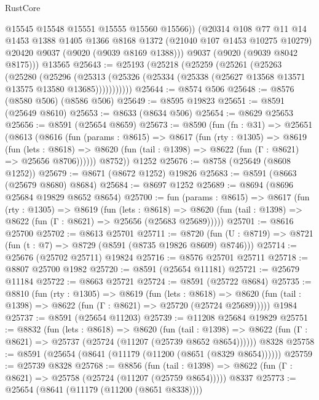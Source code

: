 \begin{lexlean}{RustCore}
\begin{coremodule}
          @15545
          @15548
          @15551
          @15555
          @15560
          @15566))
      (@20314
        @108
        @77
        @11
        @14
        @1453
        @1388
        @1405
        @1366
        @8168
        @1372
        (@21040 @107 @1453 @10275 @10279)
        @20420
        @9037
        (@9020 (@9039 @8169 @1388)))
      @9037
      (@9020 (@9039 @8042 @8175)))
    @13565
@25643 := @25193
    (@25218
      (@25259
        (@25261
          (@25263
            (@25280
              (@25296
                (@25313
                  (@25326 (@25334 (@25338 (@25627 @13568 @13571 @13575 @13580 @13685)))))))))))
@25644 := @8574 @506
@25648 := @8576 (@8580 @506) (@8586 @506)
@25649 := @8595 @19823
@25651 := @8591 (@25649 @8610)
@25653 := @8633 (@8634 @506)
@25654 := @8629 @25653
@25656 := @8591 (@25654 @8659)
@25673 := @8590
    (fun (fn : @31) =>
    @25651
      (@8613
        (@8616
          (fun (params : @8615) =>
          @8617
            (fun (rty : @1305) =>
            @8619
              (fun (lets : @8618) =>
              @8620 (fun (tail : @1398) => @8622 (fun (Γ : @8621) => @25656 @8706))))))
        @8752))
    @1252
@25676 := @8758 (@25649 (@8608 @1252))
@25679 := @8671 (@8672 @1252) @19826
@25683 := @8591 (@8663 (@25679 @8680) @8684)
@25684 := @8697 @1252
@25689 := @8694 (@8696 @25684 @19829 @8652 @8654)
@25700 := fun (params : @8615) =>
  @8617
    (fun (rty : @1305) =>
    @8619
      (fun (lets : @8618) =>
      @8620 (fun (tail : @1398) => @8622 (fun (Γ : @8621) => @25656 (@25683 @25689)))))
@25701 := @8616 @25700
@25702 := @8613 @25701
@25711 := @8720
    (fun (U : @8719) => @8721 (fun (t : @7) => @8729 (@8591 (@8735 @19826 @8609) @8746)))
@25714 := @25676 (@25702 @25711) @19824
@25716 := @8576 @25701 @25711
@25718 := @8807 @25700 @1982
@25720 := @8591 (@25654 @11181)
@25721 := @25679 @11184
@25722 := @8663 @25721
@25724 := @8591 (@25722 @8684)
@25735 := @8810
    (fun (rty : @1305) =>
    @8619
      (fun (lets : @8618) =>
      @8620 (fun (tail : @1398) => @8622 (fun (Γ : @8621) => @25720 (@25724 @25689)))))
    @1984
@25737 := @8591 (@25654 @11203)
@25739 := @11208 @25684 @19829
@25751 := @8832
    (fun (lets : @8618) =>
    @8620
      (fun (tail : @1398) =>
      @8622 (fun (Γ : @8621) => @25737 (@25724 (@11207 (@25739 @8652 @8654))))))
    @8328
@25758 := @8591 (@25654 (@8641 (@11179 (@11200 (@8651 (@8329 @8654))))))
@25759 := @25739 @8328
@25768 := @8856
    (fun (tail : @1398) => @8622 (fun (Γ : @8621) => @25758 (@25724 (@11207 (@25759 @8654)))))
    @8337
@25773 := @25654 (@8641 (@11179 (@11200 (@8651 @8338))))

\end{coremodule}
\end{lexlean}
